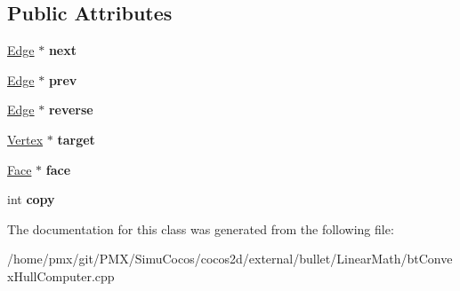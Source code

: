 \subsection*{Public Attributes}
\begin{DoxyCompactItemize}
\item 
\mbox{\label{classbtConvexHullInternal_1_1Edge_aade5504aee3a33713112ce86b35d287b}} 
\hyperlink{classbtConvexHullInternal_1_1Edge}{Edge} $\ast$ {\bfseries next}
\item 
\mbox{\label{classbtConvexHullInternal_1_1Edge_a2cf4227677ef0fbd89324445696a8d52}} 
\hyperlink{classbtConvexHullInternal_1_1Edge}{Edge} $\ast$ {\bfseries prev}
\item 
\mbox{\label{classbtConvexHullInternal_1_1Edge_a3d8d29a8c597277bc97d16e7c09c5587}} 
\hyperlink{classbtConvexHullInternal_1_1Edge}{Edge} $\ast$ {\bfseries reverse}
\item 
\mbox{\label{classbtConvexHullInternal_1_1Edge_ad734b210039c6610fcc21e668be73a21}} 
\hyperlink{classbtConvexHullInternal_1_1Vertex}{Vertex} $\ast$ {\bfseries target}
\item 
\mbox{\label{classbtConvexHullInternal_1_1Edge_ab1467d5a94858b0631eb795f3e3aa961}} 
\hyperlink{classbtConvexHullInternal_1_1Face}{Face} $\ast$ {\bfseries face}
\item 
\mbox{\label{classbtConvexHullInternal_1_1Edge_a1c4a1b019fab0a142f09955eb58e69c7}} 
int {\bfseries copy}
\end{DoxyCompactItemize}


The documentation for this class was generated from the following file\+:\begin{DoxyCompactItemize}
\item 
/home/pmx/git/\+P\+M\+X/\+Simu\+Cocos/cocos2d/external/bullet/\+Linear\+Math/bt\+Convex\+Hull\+Computer.\+cpp\end{DoxyCompactItemize}
